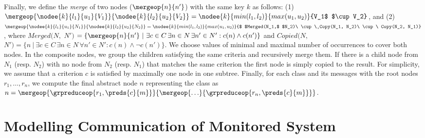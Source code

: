 {Finally, we define the \emph{merge} of two nodes ($\mergeop{n}{n'}$) with the
same key $k$ as follows: (1)
$\mergeop{\nodee{k}{l_1}{u_1}{V_1}}{\nodee{k}{l_2}{u_2}{V_2}} = \nodee{k}{min(l_1,
l_2)}{max(u_1, u_2)}{V_1$ $\cup V_2}$, and (2)
$\mergeop{\nodee{k}{l_1}{u_1}{N_1}}{\nodee{k} {l_2}{u_2}{N_2}} =
\nodee{k}{min(l_1, l_2)}{max(u_1, u_2)}{$ $Merged(N_1,$ $N_2)\ \cup\ Copy(N_1,
N_2)\ \cup\ Copy(N_2, N_1)}$, where $Merged(N,$ $N')$ $= \{\mergeop{n}{n'}\ |\
\exists c \in C \, \exists n \in N \, \exists n' \in N': c(n) \wedge c(n')\}$
and $Copied(N,$ $N') = \{n\ |\ \exists c\in C \, \exists n \in N \, \forall n'
\in N':  c(n) \wedge \neg c(n')\}$.
%
We choose values of minimal and maximal number of occurrences to cover both
nodes.
%
In the composite nodes, we group the children satisfying the same criteria and
recursively merge them.  If there is a child node from $N_1$ (resp. $N_2$) with
no node from $N_2$ (resp. $N_1$) that matches the same criterion the first node
is simply copied to the result.  For simplicity, we assume that a criterion $c$
is satisfied by maximally one node in one subtree. 
%
Finally, for each class and its messages with the root nodes $r_1, \ldots,
r_n$, we compute the final abstract node $n$ representing the class as $n =
\mergeop{\grpreduceop{r_1,\preds{c}{m}}}{\mergeop{\ldots}{\grpreduceop{r_n,\preds{c}{m}}}}$.


\section{Modelling Communication of Monitored System}
\label{sec:model}

}
